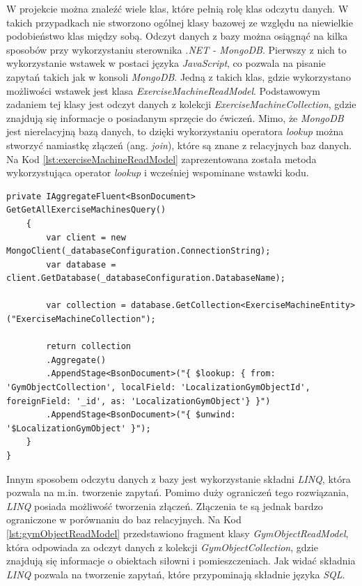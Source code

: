 \documentclass[a4paper,twoside,12pt]{book}
\newcommand{\obcy}[1]{\emph{#1}}
\newcommand{\ang}[1]{{\selectlanguage{british}\obcy{#1}}}
\begin{document}
W projekcie można znaleźć wiele klas, które pełnią rolę klas odczytu danych. W takich przypadkach nie stworzono ogólnej klasy bazowej ze względu na niewielkie podobieństwo klas między sobą. Odczyt danych z bazy można osiągnąć na kilka sposobów przy wykorzystaniu sterownika \textit{.NET - MongoDB}. Pierwszy z nich to wykorzystanie wstawek w postaci języka \textit{JavaScript}, co pozwala na pisanie zapytań takich jak w konsoli \textit{MongoDB}. Jedną z takich klas, gdzie wykorzystano możliwości wstawek jest klasa \textit{ExerciseMachineReadModel}. Podstawowym zadaniem tej klasy jest odczyt danych z kolekcji \textit{ExerciseMachineCollection}, gdzie znajdują się informacje o posiadanym sprzęcie do ćwiczeń. Mimo, że \textit{MongoDB} jest nierelacyjną bazą danych, to dzięki wykorzystaniu operatora \textit{lookup} można stworzyć namiastkę złączeń (ang. \ang{join}), które są znane z relacyjnych baz danych. Na Kod \ref{lst:exerciseMachineReadModel} zaprezentowana została metoda wykorzystująca operator \textit{lookup} i wcześniej wspominane wstawki kodu.
\begin{lstlisting}[caption={Metoda odczytu danych z kolekcji \textit{ExerciseMachineCollection} przy wykorzystaniu wstawek \textit{JavaScript}}, label={lst:exerciseMachineReadModel}]
	private IAggregateFluent<BsonDocument> GetGetAllExerciseMachinesQuery()
	{
		var client = new MongoClient(_databaseConfiguration.ConnectionString);
		var database = client.GetDatabase(_databaseConfiguration.DatabaseName);
		
		var collection = database.GetCollection<ExerciseMachineEntity>("ExerciseMachineCollection");
		
		return collection
		.Aggregate()
		.AppendStage<BsonDocument>("{ $lookup: { from: 'GymObjectCollection', localField: 'LocalizationGymObjectId', foreignField: '_id', as: 'LocalizationGymObject'} }")
		.AppendStage<BsonDocument>("{ $unwind: '$LocalizationGymObject' }");
	}
}
\end{lstlisting}
Innym sposobem odczytu danych z bazy jest wykorzystanie składni \textit{LINQ}, która pozwala na m.in. tworzenie zapytań. Pomimo duży ograniczeń tego rozwiązania, \textit{LINQ} posiada możliwość tworzenia złączeń. Złączenia te są jednak bardzo ograniczone w porównaniu do baz relacyjnych. Na Kod \ref{lst:gymObjectReadModel} przedstawiono fragment klasy \textit{GymObjectReadModel}, która odpowiada za odczyt danych z kolekcji \textit{GymObjectCollection}, gdzie znajdują się informacje o obiektach siłowni i pomieszczeniach. Jak widać składnia \textit{LINQ} pozwala na tworzenie zapytań, które przypominają składnie języka \textit{SQL}.
\end{document}
